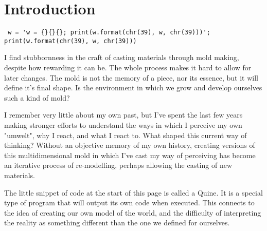 
\chapter*{Introduction}

\footnotesize \begin{verbatim}
 w = 'w = {}{}{}; print(w.format(chr(39), w, chr(39)))'; print(w.format(chr(39), w, chr(39)))
\end{verbatim} \normalsize
    

I find stubbornness in the craft of casting materials through mold making, despite how rewarding it can be. The whole process makes it hard to allow for later changes. The mold is not the memory of a piece, nor its essence, but it will define it's final shape. Is the environment in which we grow and develop ourselves such a kind of mold? 

I remember very little about my own past, but I’ve spent the last few years making stronger efforts to understand the ways in which I perceive my own "umwelt", why I react, and what I react to. What shaped this current way of thinking? Without an objective memory of my own history, creating versions of this multidimensional mold in which I’ve cast my way of perceiving has become an iterative process of re-modelling, perhaps allowing the casting of new materials.


The little snippet of code at the start of this page is called a Quine. It is a special type of program that will output its own code when executed. 
This connects to the idea of creating our own model of the world, and the difficulty of interpreting the reality as something different than the one we defined for ourselves. 
